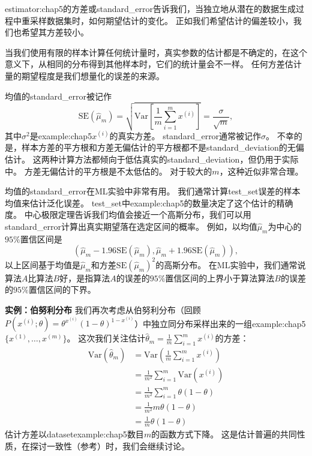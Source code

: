 \gls{estimator:chap5}的方差或\gls{standard_error}告诉我们，当独立地从潜在的数据生成过程中重采样数据集时，如何期望估计的变化。
正如我们希望估计的偏差较小，我们也希望其方差较小。

当我们使用有限的样本计算任何统计量时，真实参数的估计都是不确定的，在这个意义下，从相同的分布得到其他样本时，它们的统计量会不一样。
任何方差估计量的期望程度是我们想量化的误差的来源。

均值的\gls{standard_error}被记作
\begin{equation}
\label{eq:5.46}
    \text{SE}(\hat{\mu}_m) = \sqrt{ \text{Var} \left[ \frac{1}{m} \sum_{i=1}^m x^{(i)} \right] } = \frac{\sigma}{\sqrt{m}},
\end{equation}
其中$\sigma^2$是\gls{example:chap5}$x^{(i)}$的真实方差。
\gls{standard_error}通常被记作$\sigma$。
不幸的是，样本方差的平方根和方差无偏估计的平方根都不是\gls{standard_deviation}的无偏估计。
这两种计算方法都倾向于低估真实的\gls{standard_deviation}，但仍用于实际中。
方差无偏估计的平方根是不太低估的。
对于较大的$m$，这种近似非常合理。


均值的\gls{standard_error}在\gls{ML}实验中非常有用。
我们通常计算\gls{test_set}误差的样本均值来估计泛化误差。
\gls{test_set}中\gls{example:chap5}的数量决定了这个估计的精确度。
中心极限定理告诉我们均值会接近一个高斯分布，我们可以用\gls{standard_error}计算出真实期望落在选定区间的概率。
例如，以均值$\hat{\mu}_m$为中心的$95\%$置信区间是
\begin{equation}
    ( \hat{\mu}_m - 1.96\text{SE}(\hat{\mu}_m), \hat{\mu}_m + 1.96 \text{SE}(\hat{\mu}_m) ),
\end{equation}
以上区间基于均值是$\hat{\mu}_m$和方差$\text{SE}(\hat{\mu}_m)^2$的高斯分布。
在\gls{ML}实验中，我们通常说算法$A$比算法$B$好，是指算法$A$的误差的$95\%$置信区间的上界小于算法算法$B$的误差的$95\%$置信区间的下界。

\textbf{实例：伯努利分布} \quad 我们再次考虑从伯努利分布（回顾$P(x^{(i)}; \theta) = \theta^{x^{(i)}} (1-\theta)^{1 - x^{(i)}}$）中独立同分布采样出来的一组\gls{example:chap5}$\{ x^{(1)}, \dots, x^{(m)} \}$。
这次我们关注估计$\hat{\theta}_m = \frac{1}{m} \sum_{i=1}^m x^{(i)}$的方差：
\begin{align}
    \text{Var}\left( \hat{\theta}_m \right) &= \text{Var}\left( \frac{1}{m} \sum_{i=1}^m x^{(i)} \right) \\
    &= \frac{1}{m^2} \sum_{i=1}^m \text{Var} \left( x^{(i)} \right) \\
    &= \frac{1}{m^2} \sum_{i=1}^m \theta (1 - \theta) \\
    &= \frac{1}{m^2} m\theta(1-\theta) \\
    &= \frac{1}{m} \theta(1-\theta)
\end{align} 
估计方差以\gls{dataset}\gls{example:chap5}数目$m$的函数方式下降。
这是估计普遍的共同性质，在探讨一致性（参考）时，我们会继续讨论。

